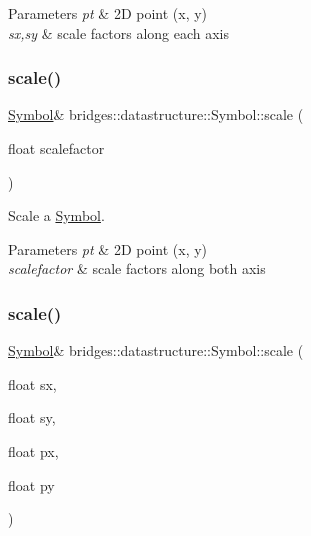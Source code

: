 \begin{DoxyParams}{Parameters}
{\em pt} & 2D point (x, y) \\
\hline
{\em sx,sy} & scale factors along each axis \\
\hline
\end{DoxyParams}
\mbox{\label{classbridges_1_1datastructure_1_1_symbol_a444bdb4259285dc95e13d27303f94102}} 
\subsubsection{\texorpdfstring{scale()}{scale()}\hspace{0.1cm}{\footnotesize\ttfamily [2/3]}}
{\footnotesize\ttfamily \hyperlink{classbridges_1_1datastructure_1_1_symbol}{Symbol}\& bridges\+::datastructure\+::\+Symbol\+::scale (\begin{DoxyParamCaption}\item[{float}]{scalefactor }\end{DoxyParamCaption})\hspace{0.3cm}{\ttfamily [inline]}}



Scale a \hyperlink{classbridges_1_1datastructure_1_1_symbol}{Symbol}. 


\begin{DoxyParams}{Parameters}
{\em pt} & 2D point (x, y) \\
\hline
{\em scalefactor} & scale factors along both axis \\
\hline
\end{DoxyParams}
\mbox{\label{classbridges_1_1datastructure_1_1_symbol_af19cf1d01da1070509bf7c8fce36b3ce}} 
\subsubsection{\texorpdfstring{scale()}{scale()}\hspace{0.1cm}{\footnotesize\ttfamily [3/3]}}
{\footnotesize\ttfamily \hyperlink{classbridges_1_1datastructure_1_1_symbol}{Symbol}\& bridges\+::datastructure\+::\+Symbol\+::scale (\begin{DoxyParamCaption}\item[{float}]{sx,  }\item[{float}]{sy,  }\item[{float}]{px,  }\item[{float}]{py }\end{DoxyParamCaption})\hspace{0.3cm}{\ttfamily [inline]}}



